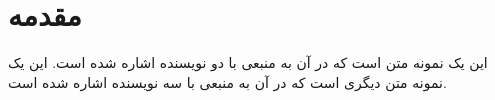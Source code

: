 \documentclass{article}
\begin{document}
	
	\section{مقدمه}	
	این یک نمونه متن است که در آن به منبعی با دو نویسنده
	\parencite{ref1}
	اشاره شده است.
	این یک نمونه متن دیگری است که در آن به منبعی با سه نویسنده
	\parencite{ref2}
	اشاره شده است.
	
	\printbibliography
	
\end{document}
